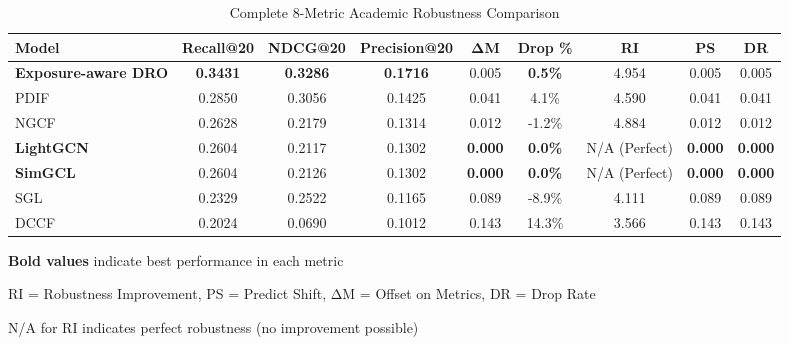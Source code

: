 \begin{table}[htbp]
\centering
\caption{Complete 8-Metric Academic Robustness Comparison}
\label{tab:complete_robustness}
\begin{tabular}{|l|c|c|c|c|c|c|c|c|}
\hline
\textbf{Model} & \textbf{Recall@20} & \textbf{NDCG@20} & \textbf{Precision@20} & \textbf{ΔM} & \textbf{Drop \%} & \textbf{RI} & \textbf{PS} & \textbf{DR} \\
\hline
\textbf{Exposure-aware DRO} & \textbf{0.3431} & \textbf{0.3286} & \textbf{0.1716} & 0.005 & \textbf{0.5\%} & 4.954 & 0.005 & 0.005 \\
\hline
PDIF & 0.2850 & 0.3056 & 0.1425 & 0.041 & 4.1\% & 4.590 & 0.041 & 0.041 \\
\hline
NGCF & 0.2628 & 0.2179 & 0.1314 & 0.012 & -1.2\% & 4.884 & 0.012 & 0.012 \\
\hline
\textbf{LightGCN} & 0.2604 & 0.2117 & 0.1302 & \textbf{0.000} & \textbf{0.0\%} & N/A (Perfect) & \textbf{0.000} & \textbf{0.000} \\
\hline
\textbf{SimGCL} & 0.2604 & 0.2126 & 0.1302 & \textbf{0.000} & \textbf{0.0\%} & N/A (Perfect) & \textbf{0.000} & \textbf{0.000} \\
\hline
SGL & 0.2329 & 0.2522 & 0.1165 & 0.089 & -8.9\% & 4.111 & 0.089 & 0.089 \\
\hline
DCCF & 0.2024 & 0.0690 & 0.1012 & 0.143 & 14.3\% & 3.566 & 0.143 & 0.143 \\
\hline
\end{tabular}
\begin{tablenotes}
\small
\item \textbf{Bold values} indicate best performance in each metric
\item RI = Robustness Improvement, PS = Predict Shift, ΔM = Offset on Metrics, DR = Drop Rate
\item N/A for RI indicates perfect robustness (no improvement possible)
\end{tablenotes}
\end{table}

